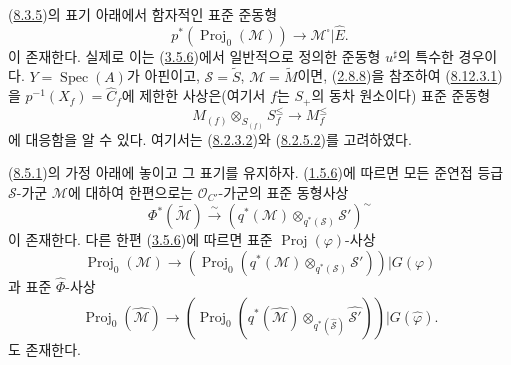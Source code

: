 \begin{env}[8.12.3]
\label{II.8.12.3-ko}
(\hyperref[II.8.3.5-ko]{8.3.5})의 표기 아래에서 함자적인 표준 준동형
\begin{equation}
\label{II.8.12.3.1-ko}
  p^*(\operatorname{Proj}_0(\mathcal{M}))
  \to\mathcal{M}^{\square}|\widehat{E}.
\tag{8.12.3.1}
\end{equation}
이 존재한다. 실제로 이는 (\hyperref[II.3.5.6-ko]{3.5.6})에서 일반적으로
정의한 준동형 $u^{\sharp}$의 특수한 경우이다.
$Y=\operatorname{Spec}(A)$가 아핀이고, $\mathcal{S}=\widetilde{S}$,
$\mathcal{M}=\widetilde{M}$이면, (\hyperref[II.2.8.8-ko]{2.8.8})을
참조하여 (\hyperref[II.8.12.3.1-ko]{8.12.3.1})을
$p^{-1}(X_f)=\widehat{C}_f$에 제한한 사상은(여기서 $f$는 $S_+$의
동차 원소이다) 표준 준동형
\begin{equation}
\label{II.8.12.3.2-ko}
  M_{(f)}\otimes_{S_{(f)}}S_f^{\leq}\to M_f^{\leq}
\tag{8.12.3.2}
\end{equation}
에 대응함을 알 수 있다. 여기서는
(\hyperref[II.8.2.3.2-ko]{8.2.3.2})와
(\hyperref[II.8.2.5.2-ko]{8.2.5.2})를 고려하였다.
\end{env}

\begin{env}[8.12.4]
\label{II.8.12.4-ko}
(\hyperref[II.8.5.1-ko]{8.5.1})의 가정 아래에 놓이고 그 표기를
유지하자. (\hyperref[II.1.5.6-ko]{1.5.6})에 따르면 모든 준연접 등급
$\mathcal{S}$-가군 $\mathcal{M}$에 대하여 한편으로는
$\mathcal{O}_{C'}$-가군의 표준 동형사상
\begin{equation}
\label{II.8.12.4.1-ko}
  \Phi^*(\widetilde{\mathcal{M}})
  \xrightarrow{\sim}
  \left(q^*(\mathcal{M})\otimes_{q^*(\mathcal{S})}\mathcal{S}'\right)^{\sim}
\tag{8.12.4.1}
\end{equation}
이 존재한다. 다른 한편 (\hyperref[II.3.5.6-ko]{3.5.6})에 따르면
표준 $\operatorname{Proj}(\varphi)$-사상
\begin{equation}
\label{II.8.12.4.2-ko}
  \operatorname{Proj}_0(\mathcal{M})\to
  \left(\operatorname{Proj}_0
  (q^*(\mathcal{M})\otimes_{q^*(\mathcal{S})}\mathcal{S}')\right)
  |G(\varphi)
\tag{8.12.4.2}
\end{equation}
과 표준 $\widehat{\Phi}$-사상
\begin{equation}
\label{II.8.12.4.3-ko}
  \operatorname{Proj}_0(\widehat{\mathcal{M}})\to
  \left(\operatorname{Proj}_0
  (q^*(\widehat{\mathcal{M}})
  \otimes_{q^*(\widehat{\mathcal{S}})}\widehat{\mathcal{S}'})\right)
  |G(\widehat{\varphi}).
\tag{8.12.4.3}
\end{equation}
도 존재한다.
\end{env}

